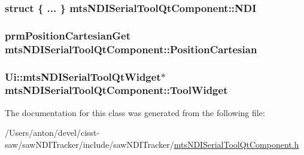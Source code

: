 \subsubsection[{N\+D\+I}]{\setlength{\rightskip}{0pt plus 5cm}struct \{ ... \}   mts\+N\+D\+I\+Serial\+Tool\+Qt\+Component\+::\+N\+D\+I\hspace{0.3cm}{\ttfamily [protected]}}\label{classmts_n_d_i_serial_tool_qt_component_ad73d0d491f1f7da8040c36af309356cf}
\hypertarget{classmts_n_d_i_serial_tool_qt_component_aeeeb01caede4ad7c1b9861e6b5325941}{}
\subsubsection[{Position\+Cartesian}]{\setlength{\rightskip}{0pt plus 5cm}prm\+Position\+Cartesian\+Get mts\+N\+D\+I\+Serial\+Tool\+Qt\+Component\+::\+Position\+Cartesian}\label{classmts_n_d_i_serial_tool_qt_component_aeeeb01caede4ad7c1b9861e6b5325941}
\hypertarget{classmts_n_d_i_serial_tool_qt_component_af967ad37bf503470a35cb6fd9b6bd247}{}
\subsubsection[{Tool\+Widget}]{\setlength{\rightskip}{0pt plus 5cm}Ui\+::mts\+N\+D\+I\+Serial\+Tool\+Qt\+Widget$\ast$ mts\+N\+D\+I\+Serial\+Tool\+Qt\+Component\+::\+Tool\+Widget\hspace{0.3cm}{\ttfamily [protected]}}\label{classmts_n_d_i_serial_tool_qt_component_af967ad37bf503470a35cb6fd9b6bd247}


The documentation for this class was generated from the following file\+:\begin{DoxyCompactItemize}
\item 
/\+Users/anton/devel/cisst-\/saw/saw\+N\+D\+I\+Tracker/include/saw\+N\+D\+I\+Tracker/\hyperlink{mts_n_d_i_serial_tool_qt_component_8h}{mts\+N\+D\+I\+Serial\+Tool\+Qt\+Component.\+h}\end{DoxyCompactItemize}
